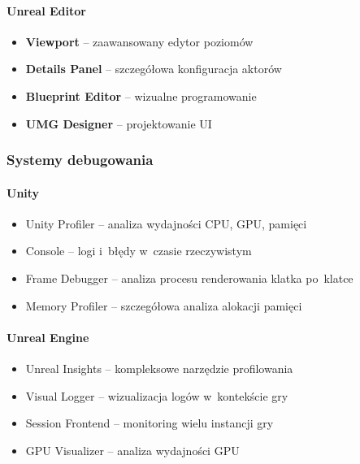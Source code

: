 \paragraph{Unreal Editor}
\begin{itemize}
    \item \textbf{Viewport} -- zaawansowany edytor poziomów
    \item \textbf{Details Panel} -- szczegółowa konfiguracja aktorów
    \item \textbf{Blueprint Editor} -- wizualne programowanie
    \item \textbf{UMG Designer} -- projektowanie UI
\end{itemize}

\subsubsection{Systemy debugowania}

\paragraph{Unity}
\begin{itemize}
    \item Unity Profiler -- analiza wydajności CPU, GPU, pamięci~\cite{unity_profiler}
    \item Console -- logi i~błędy w~czasie rzeczywistym~\cite{unity_profiler}
    \item Frame Debugger -- analiza procesu renderowania klatka po~klatce~\cite{unity_profiler}
    \item Memory Profiler -- szczegółowa analiza alokacji pamięci~\cite{unity_profiler}
\end{itemize}

\paragraph{Unreal Engine}
\begin{itemize}
    \item Unreal Insights -- kompleksowe narzędzie profilowania~\cite{unreal_insights}
    \item Visual Logger -- wizualizacja logów w~kontekście gry~\cite{unreal_insights}
    \item Session Frontend -- monitoring wielu instancji gry~\cite{unreal_insights}
    \item GPU Visualizer -- analiza wydajności GPU~\cite{unreal_insights}
\end{itemize}

